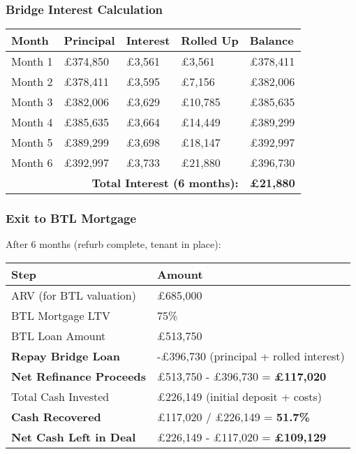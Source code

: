 \documentclass[11pt,a4paper]{article}
\begin{document}
\subsubsection{Bridge Interest Calculation}

\begin{longtable}{@{}p{3cm}p{2.5cm}p{2.5cm}p{2.5cm}p{2.5cm}@{}}
\toprule
\textbf{Month} & \textbf{Principal} & \textbf{Interest} & \textbf{Rolled Up} & \textbf{Balance} \\
\midrule
Month 1 & £374,850 & £3,561 & £3,561 & £378,411 \\
Month 2 & £378,411 & £3,595 & £7,156 & £382,006 \\
Month 3 & £382,006 & £3,629 & £10,785 & £385,635 \\
Month 4 & £385,635 & £3,664 & £14,449 & £389,299 \\
Month 5 & £389,299 & £3,698 & £18,147 & £392,997 \\
Month 6 & £392,997 & £3,733 & £21,880 & £396,730 \\
\midrule
\multicolumn{4}{r}{\textbf{Total Interest (6 months):}} & \textbf{£21,880} \\
\bottomrule
\end{longtable}

\subsubsection{Exit to BTL Mortgage}

After 6 months (refurb complete, tenant in place):

\begin{longtable}{@{}p{5cm}p{9cm}@{}}
\toprule
\textbf{Step} & \textbf{Amount} \\
\midrule
ARV (for BTL valuation) & £685,000 \\
BTL Mortgage LTV & 75\% \\
BTL Loan Amount & £513,750 \\
\addlinespace
\textbf{Repay Bridge Loan} & -£396,730 (principal + rolled interest) \\
\textbf{Net Refinance Proceeds} & £513,750 - £396,730 = \textbf{£117,020} \\
\addlinespace
Total Cash Invested & £226,149 (initial deposit + costs) \\
\textbf{Cash Recovered} & £117,020 / £226,149 = \textbf{51.7\%} \\
\textbf{Net Cash Left in Deal} & £226,149 - £117,020 = \textbf{£109,129} \\
\bottomrule
\end{longtable}
\end{document}
